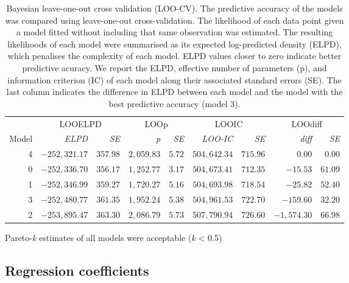 \documentclass[
  letterpaper,
  DIV=11,
  numbers=noendperiod]{scrartcl}
\begin{document}
\hypertarget{tbl-results-loos}{}
\setlength{\LTpost}{0mm}
\begin{longtable}{rrrrrrrrr}
\caption{\label{tbl-results-loos}Bayesian leave-one-out cross validation (LOO-CV). The predictive
accuracy of the models was compared using leave-one-out
cross-validation. The likelihood of each data point given a model fitted
without including that same observation was estimated. The resulting
likelihoods of each model were summarised as its expected log-predicted
density (ELPD), which penalises the complexity of each model. ELPD
values closer to zero indicate better predictive acuracy. We report the
ELPD, effective number of parameters (p), and information criterion (IC)
of each model along their associated standard errors (SE). The last
column indicates the difference in ELPD between each model and the model
with the best predictive accuracy (model 3). }\tabularnewline

\toprule
 & \multicolumn{2}{c}{LOOELPD} & \multicolumn{2}{c}{LOOp} & \multicolumn{2}{c}{LOOIC} & \multicolumn{2}{c}{LOOdiff} \\ 
\cmidrule(lr){2-3} \cmidrule(lr){4-5} \cmidrule(lr){6-7} \cmidrule(lr){8-9}
Model & \emph{ELPD} & \emph{SE} & \emph{p} & \emph{SE} & \emph{LOO-IC} & \emph{SE} & \emph{diff} & \emph{SE} \\ 
\midrule
4 & $-252,321.17$ & $357.98$ & $2,059.83$ & $5.72$ & $504,642.34$ & $715.96$ & $0.00$ & $0.00$ \\ 
0 & $-252,336.70$ & $356.17$ & $1,252.77$ & $3.17$ & $504,673.41$ & $712.35$ & $-15.53$ & $61.09$ \\ 
1 & $-252,346.99$ & $359.27$ & $1,720.27$ & $5.16$ & $504,693.98$ & $718.54$ & $-25.82$ & $52.40$ \\ 
3 & $-252,480.77$ & $361.35$ & $1,952.24$ & $5.38$ & $504,961.53$ & $722.70$ & $-159.60$ & $32.20$ \\ 
2 & $-253,895.47$ & $363.30$ & $2,086.79$ & $5.73$ & $507,790.94$ & $726.60$ & $-1,574.30$ & $66.98$ \\ 
\bottomrule
\end{longtable}
\begin{minipage}{\linewidth}
Pareto-\emph{k} estimates of all models were acceptable (\emph{k} \textless{} 0.5)\\
\end{minipage}

\hypertarget{sec-coefficients}{%
\subsection{Regression coefficients}\label{sec-coefficients}}
\end{document}
